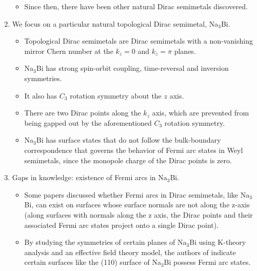 \documentclass[english]{revtex4-1}
\begin{document}
\begin{enumerate}
\begin{itemize}
        \item Since then, there have been other natural Dirac semimetals discovered.
        
    \end{itemize}
    
    \item We focus on a particular natural topological Dirac semimetal, Na$_3$Bi. 
    
    \begin{itemize}
    
        \item Topological Dirac semimetals are Dirac semimetals with a non-vanishing mirror Chern number at the $k_z = 0$ and $k_z = \pi$ planes.
        
        \item Na$_3$Bi has strong spin-orbit coupling, time-reversal and inversion symmetries.
        
        \item It also has $C_3$ rotation symmetry about the $z$ axis.
        
        \item There are two Dirac points along the $k_z$ axis, which are prevented from being gapped out by the aforementioned $C_3$ rotation symmetry.
        
        \item Na$_3$Bi has surface states that do not follow the bulk-boundary correspondence that governs the behavior of Fermi arc states in Weyl semimetals, since the monopole charge of the Dirac points is zero. 
        
    \end{itemize}    

    \item Gaps in knowledge: existence of Fermi arcs in Na$_3$Bi.
    
    \begin{itemize}
    
        \item Some papers discussed whether Fermi arcs in Dirac semimetals, like Na$_3$Bi, can exist on surfaces whose surface normals are not along the z-axis (along surfaces with normals along the z axis, the Dirac points and their associated Fermi arc states project onto a single Dirac point). \cite{kargarian_are_2016}

        \item By studying the symmetries of certain planes  of Na$_{3}$Bi using K-theory analysis and an effective field theory model, the authors of \cite{kargarian_are_2016} indicate certain surfaces like the (110) surface of Na$_{3}$Bi possess Fermi arc states.


\end{itemize}
\end{enumerate}
\end{document}

